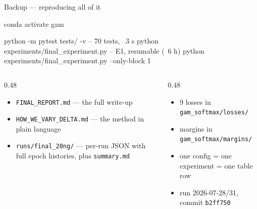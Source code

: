 \begin{frame}[fragile]{Backup --- reproducing all of it}
  \small
  \begin{semiverbatim}\scriptsize
conda activate gam

python -m pytest tests/ -v                    \textcolor{gamgrey}{-- 70 tests, ~3 s}
python experiments/final_experiment.py        \textcolor{gamgrey}{-- E1, resumable (~6 h)}
python experiments/final_experiment.py --only-block 1
  \end{semiverbatim}
  \begin{columns}[T]
    \begin{column}{0.48\textwidth}
      \begin{itemize}\setlength\itemsep{0.1em}
        \item \texttt{FINAL\_REPORT.md} --- the full write-up
        \item \texttt{HOW\_WE\_VARY\_DELTA.md} --- the method in plain language
        \item \texttt{runs/final\_20ng/} --- per-run JSON with full epoch
              histories, plus \texttt{summary.md}
      \end{itemize}
    \end{column}
    \begin{column}{0.48\textwidth}
      \begin{itemize}\setlength\itemsep{0.1em}
        \item 9 losses in \texttt{gam\_softmax/losses/}
        \item margins in \texttt{gam\_softmax/margins/}
        \item one config = one experiment = one table row
        \item run 2026-07-28/31, commit \texttt{b2ff750}
      \end{itemize}
    \end{column}
  \end{columns}
\end{frame}
